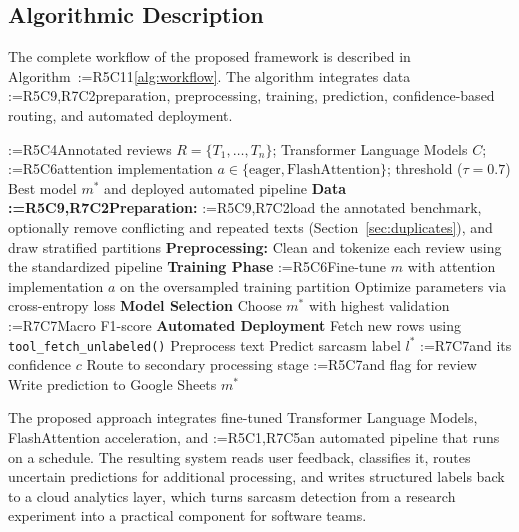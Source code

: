 \documentclass[a4paper,fleqn]{cas-sc}
\makeatletter
\newif\iftracked
\newcommand{\rv@setcolour}[1]{%
  \IfStrEq{#1}{R7C7}{\color{rvEdit}}{%
    \IfSubStr{#1}{R5}{\IfSubStr{#1}{R7}{\color{rvBoth}}{\color{rvFive}}}{\color{rvSeven}}}}
\newcommand{\rv@tag}[1]{\textsuperscript{\sffamily\bfseries\scriptsize[\StrSubstitute{#1}{,}{, }]}\,}
\newcommand{\rv@recordone}[1]{%
  \edef\rv@i{#1}%
  \ifcsdef{rv@n@\rv@i}{}{\csgdef{rv@n@\rv@i}{0}}%
  \csxdef{rv@n@\rv@i}{\the\numexpr\csuse{rv@n@\rv@i}+1\relax}%
  \begingroup\edef\@currentlabel{\rv@i}\label{rv:\rv@i:\csuse{rv@n@\rv@i}}\endgroup}
\newcommand{\rv@record}[1]{\@for\rv@id:=#1\do{\expandafter\rv@recordone\expandafter{\rv@id}}}
\DeclareRobustCommand{\rc}[2]{\rv@record{#1}\iftracked{\rv@setcolour{#1}\rv@tag{#1}#2}\else#2\fi}
\DeclareRobustCommand{\rcrep}[3]{\rv@record{#1}\iftracked{\rv@setcolour{#1}\rv@tag{#1}\rv@strike{#2} #3}\else#3\fi}
\DeclareRobustCommand{\rce}[1]{\rv@record{R7C7}\iftracked{\color{rvEdit}#1}\else#1\fi}
\makeatother
\begin{document}
\subsection{Algorithmic Description}
The complete workflow of the proposed framework is described in Algorithm~\rcrep{R5C11}{3.9}{\ref{alg:workflow}}. The algorithm integrates data \rcrep{R5C9,R7C2}{collection}{preparation}, preprocessing, training, prediction, confidence-based routing, and automated deployment.

\begin{algorithm}[t]
\caption{Transformer-Based Sarcasm Detection and Automated Deployment}
\label{alg:workflow}
\begin{algorithmic}[1]
\Require \rcrep{R5C4}{Raw reviews $R=\{r_1,\ldots,r_n\}$}{Annotated reviews $R = \{T_1,\ldots,T_n\}$}; Transformer Language Models $C$; \rc{R5C6}{attention implementation $a \in \{\text{eager}, \text{FlashAttention}\}$;} threshold ($\tau = 0.7$)
\Ensure Best model $m^{*}$ and deployed automated pipeline
\State \textbf{Data \rcrep{R5C9,R7C2}{Collection}{Preparation}:} \rcrep{R5C9,R7C2}{Scrape reviews and label them into sarcasm categories}{load the annotated benchmark, optionally remove conflicting and repeated texts (Section~\ref{sec:duplicates}), and draw stratified partitions}
\State \textbf{Preprocessing:} Clean and tokenize each review using the standardized pipeline
\State \textbf{Training Phase}
  \State \rcrep{R5C6}{Train $m$ using FlashAttention}{Fine-tune $m$ with attention implementation $a$ on the oversampled training partition}
  \State Optimize parameters via cross-entropy loss
\EndFor
\State \textbf{Model Selection}
\State Choose $m^{*}$ with highest validation \rce{Macro} F1-score
\State \textbf{Automated Deployment}
  \State Fetch new rows using \texttt{tool\_fetch\_unlabeled()}
  \State Preprocess text
  \State Predict sarcasm label $l^{*}$ \rc{R7C7}{and its confidence $c$}
  \If{\rcrep{R7C7}{$f_{l^{*}}<\tau$}{$c < \tau$}}
    \State Route to secondary processing stage \rc{R5C7}{and flag for review}
  \EndIf
  \State Write prediction to Google Sheets
\EndWhile
\State \Return $m^{*}$
\end{algorithmic}
\end{algorithm}

The proposed approach integrates fine-tuned Transformer Language Models, FlashAttention acceleration, and \rcrep{R5C1,R7C5}{a continuously operating automated pipeline}{an automated pipeline that runs on a schedule}. The resulting system reads user feedback, classifies it, routes uncertain predictions for additional processing, and writes structured labels back to a cloud analytics layer, which turns sarcasm detection from a research experiment into a practical component for software teams.
\end{document}
